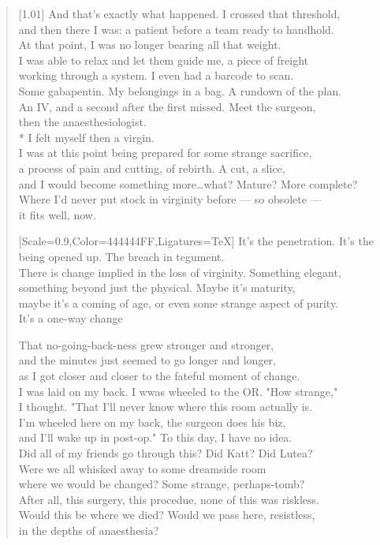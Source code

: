 \begin{verse}[1.01\textwidth]
  And that's exactly what happened. I crossed that threshold,\\
  and then there I was: a patient before a team ready to handhold.\\
  At that point, I was no longer bearing all that weight.\\
  I was able to relax and let them guide me, a piece of freight\\
  working through a system. I even had a barcode to scan.\\
  Some gabapentin. My belongings in a bag. A rundown of the plan.\\
  An IV, and a second after the first missed. Meet the surgeon,\\
  then the anaesthesiologist.\\*
   I felt myself then a virgin.\\
  I was at this point being prepared for some strange sacrifice,\\
  a process of pain and cutting, of rebirth. A cut, a slice,\\
  and I would become something more\ldots{}what? Mature? More complete?\\
  Where I'd never put stock in virginity before --- so obsolete ---\\
  it fits well, now.

  {[Scale=0.9,Color=444444FF,Ligatures=TeX]
  \vin It's the penetration. It's the being opened up. The breach in tegument.\\
  \vin There is change implied in the loss of virginity. Something elegant,\\
  \vin something beyond just the physical. Maybe it's maturity,\\
  \vin maybe it's a coming of age, or even some strange aspect of purity.\\
  \vin It's a one-way change}

  That no-going-back-ness grew stronger and stronger,\\
  and the minutes just seemed to go longer and longer,\\
  as I got closer and closer to the fateful moment of change.\\
  I was laid on my back. I wwas wheeled to the OR. "How strange,"\\
  I thought. "That I'll never know where this room actually is.\\
  I'm wheeled here on my back, the surgeon does his biz,\\
  and I'll wake up in post-op." To this day, I have no idea.\\
  Did all of my friends go through this? Did Katt? Did Lutea?\\
  Were we all whisked away to some dreamside room\\
  where we would be changed? Some strange, perhaps-tomb?\\
  After all, this surgery, this procedue, none of this was riskless.\\
  Would this be where we died? Would we pass here, resistless,\\
  in the depths of anaesthesia?
  \newpage


\end{verse}
